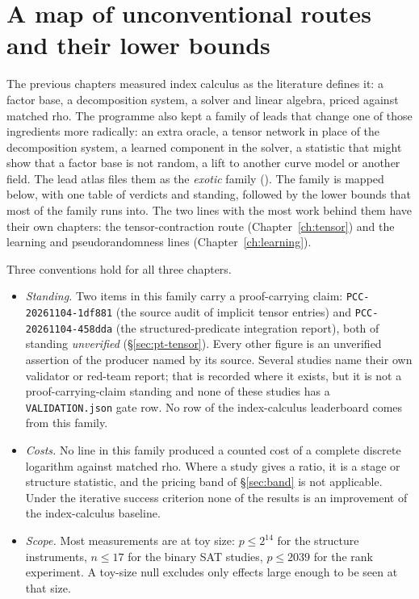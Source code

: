 
\chapter{A map of unconventional routes and their lower bounds}\label{ch:unconvmap}

The previous chapters measured index calculus as the literature defines it:
a factor base, a decomposition system, a solver and linear algebra, priced
against matched rho. The programme also kept a family of leads that change
one of those ingredients more radically: an extra oracle, a tensor network
in place of the decomposition system, a learned component in the solver, a
statistic that might show that a factor base is not random, a lift to
another curve model or another field. The lead atlas files them as the
\emph{exotic} family ().
The family is mapped below, with one table of verdicts and standing,
followed by the lower bounds that most of the family runs into. The two
lines with the most work behind them have their own chapters: the
tensor-contraction route (Chapter~\ref{ch:tensor}) and the learning and
pseudorandomness lines (Chapter~\ref{ch:learning}).

Three conventions hold for all three chapters.
\begin{itemize}
\item \emph{Standing.} Two items in this family carry a proof-carrying
  claim: \texttt{PCC-20261104-1df881} (the source audit of implicit tensor
  entries) and \texttt{PCC-20261104-458dda} (the structured-predicate
  integration report), both of standing \emph{unverified}
  (\S\ref{sec:pt-tensor}). Every other figure is an unverified assertion of
  the producer named by its source. Several studies name their own
  validator or red-team report; that is recorded where it exists, but it is
  not a proof-carrying-claim standing and none of these studies has a
  \texttt{VALIDATION.json} gate row. No row of the index-calculus
  leaderboard comes from this family.
\item \emph{Costs.} No line in this family produced a counted cost of a
  complete discrete logarithm against matched rho. Where a study gives a
  ratio, it is a stage or structure statistic, and the pricing band of
  \S\ref{sec:band} is not applicable. Under the iterative success criterion
  none of the results is an improvement of the index-calculus baseline.
\item \emph{Scope.} Most measurements are at toy size: $p\le2^{14}$ for the
  structure instruments, $n\le17$ for the binary SAT studies, $p\le2039$ for
  the rank experiment. A toy-size null excludes only effects large enough
  to be seen at that size.
\end{itemize}

